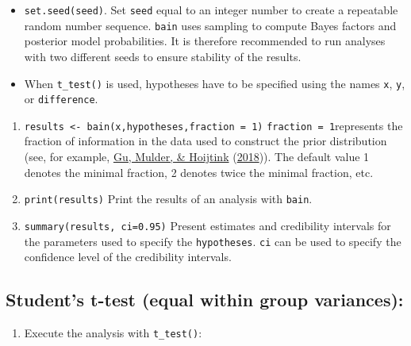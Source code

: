 \documentclass[
]{book}
\providecommand{\tightlist}{%
  \setlength{\itemsep}{0pt}\setlength{\parskip}{0pt}}
\begin{document}
\begin{itemize}
\item
  \texttt{set.seed(seed)}. Set \texttt{seed} equal to an integer number to create a repeatable random number sequence. \texttt{bain} uses sampling to compute Bayes factors and posterior model probabilities. It is therefore recommended to run analyses with two different seeds to ensure stability of the results.
\item
  When \texttt{t\_test()} is used, hypotheses have to be specified using the names \texttt{x}, \texttt{y}, or \texttt{difference}.
\end{itemize}

\begin{enumerate}
\def\labelenumi{\arabic{enumi})}
\setcounter{enumi}{2}
\item
  \texttt{results\ \textless{}-\ bain(x,hypotheses,fraction\ =\ 1)}
  \texttt{fraction\ =\ 1}represents the fraction of information in the data used to construct the prior distribution (see, for example, \protect\hyperlink{ref-gu2018approximated}{Gu, Mulder, \& Hoijtink} (\protect\hyperlink{ref-gu2018approximated}{2018})). The default value 1 denotes the minimal fraction, 2 denotes twice the minimal fraction, etc.
\item
  \texttt{print(results)} Print the results of an analysis with
  \texttt{bain}.
\item
  \texttt{summary(results,\ ci=0.95)} Present estimates and credibility intervals for the parameters used to specify the \texttt{hypotheses}. \texttt{ci} can be used to specify the confidence level of the credibility intervals.
\end{enumerate}

\hypertarget{students-t-test-equal-within-group-variances}{%
\subsection{Student's t-test (equal within group variances):}\label{students-t-test-equal-within-group-variances}}

\begin{enumerate}
\def\labelenumi{\arabic{enumi})}
\tightlist
\item
  Execute the analysis with \texttt{t\_test()}:
\end{enumerate}
\end{document}
